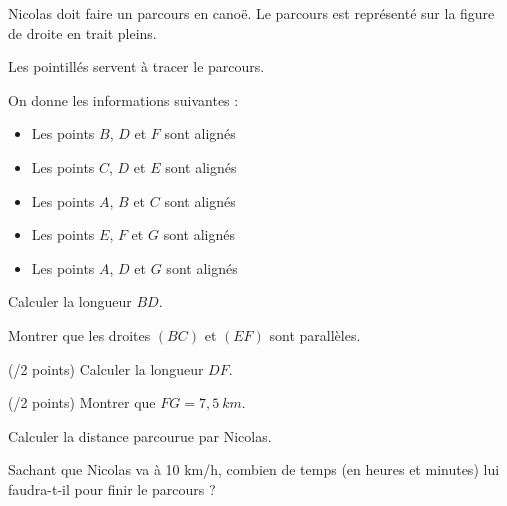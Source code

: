 \begin{minipage}[t]{0.45\textwidth}
    Nicolas doit faire un parcours en canoë. Le parcours est représenté sur la figure de droite en trait pleins.
    
    Les pointillés servent à tracer le parcours.

    On donne les informations suivantes :
    \begin{itemize}
        \item Les points $B$, $D$ et $F$ sont alignés
        \item Les points $C$, $D$ et $E$ sont alignés
        \item Les points $A$, $B$ et $C$ sont alignés
        \item Les points $E$, $F$ et $G$ sont alignés
        \item Les points $A$, $D$ et $G$ sont alignés
    \end{itemize}
    \vspace{1em}

    \cnt Calculer la longueur $BD$.

    \cnt Montrer que les droites $(BC)$ et $(EF)$ sont parallèles.

    \cnt (/2 points) Calculer la longueur $DF$.

    \cnt (/2 points) Montrer que $FG=7,5~km$.

    \cnt Calculer la distance parcourue par Nicolas.

    \cnt Sachant que Nicolas va à 10 km/h, combien de temps (en heures et minutes) lui faudra-t-il pour finir le parcours ? 
\end{minipage}
\hfill
